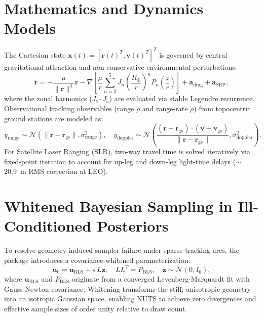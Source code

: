 \documentclass[11pt,a4paper]{article}
\begin{document}
\section{Mathematics and Dynamics Models}

The Cartesian state $\mathbf{x}(t) = [\mathbf{r}(t)^T, \mathbf{v}(t)^T]^T$ is governed by central gravitational attraction and non-conservative environmental perturbations:
\begin{equation}
\ddot{\mathbf{r}} = -\frac{\mu}{\|\mathbf{r}\|^3}\mathbf{r} - \nabla \left[ \frac{\mu}{r}\sum_{n=2}^{5} J_n \left(\frac{R_\oplus}{r}\right)^n P_n\!\left(\frac{z}{r}\right)\right] + \mathbf{a}_{\text{drag}} + \mathbf{a}_{\text{SRP}},
\end{equation}
where the zonal harmonics ($J_2$--$J_5$) are evaluated via stable Legendre recurrence. Observational tracking observables (range $\rho$ and range-rate $\dot{\rho}$) from topocentric ground stations are modeled as:
\begin{equation}
y_{\text{range}} \sim \mathcal{N}\left(\|\mathbf{r} - \mathbf{r}_{\text{gs}}\|, \sigma_{\text{range}}^2\right), \quad 
y_{\text{doppler}} \sim \mathcal{N}\left(\frac{(\mathbf{r} - \mathbf{r}_{\text{gs}}) \cdot (\mathbf{v} - \mathbf{v}_{\text{gs}})}{\|\mathbf{r} - \mathbf{r}_{\text{gs}}\|} , \sigma_{\text{doppler}}^2\right).
\end{equation}
For Satellite Laser Ranging (SLR), two-way travel time is solved iteratively via fixed-point iteration to account for up-leg and down-leg light-time delays ($\sim$20.9~m RMS correction at LEO).

\section{Whitened Bayesian Sampling in Ill-Conditioned Posteriors}

To resolve geometry-induced sampler failure under sparse tracking arcs, the package introduces a covariance-whitened parameterization:
\begin{equation}
\mathbf{u}_0 = \mathbf{u}_{\text{BLS}} + s\,L\mathbf{z}, \quad L L^T = P_{\text{BLS}}, \quad \mathbf{z} \sim \mathcal{N}(0, I_6),
\end{equation}
where $\mathbf{u}_{\text{BLS}}$ and $P_{\text{BLS}}$ originate from a converged Levenberg-Marquardt fit with Gauss-Newton covariance. Whitening transforms the stiff, anisotropic geometry into an isotropic Gaussian space, enabling NUTS to achieve zero divergences and effective sample sizes of order unity relative to draw count.
\end{document}

